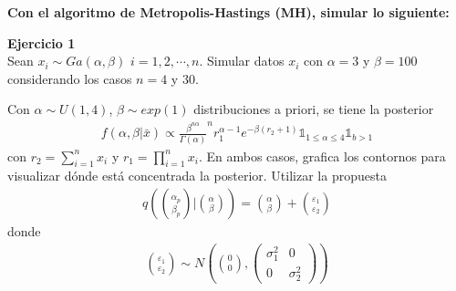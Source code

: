 \documentclass[a4paper, 11pt]{article}
\newenvironment{problem}[2][Ejercicio]
{ \begin{mdframed}[backgroundcolor= red!50] \textbf{#1 #2} \\}
	{  \end{mdframed}}
\begin{document}
	\setlength{\parskip}{\medskipamount}
	\setlength{\parindent}{0pt}
\textbf{Con el algoritmo de Metropolis-Hastings (MH), simular lo siguiente:}
\begin{problem}{1} 
  Sean $x_i \sim Ga(\alpha,\beta)$ $i =1,2,\cdots,n$. Simular datos $x_i$ con $\alpha = 3$ y $\beta = 100$ considerando los casos $n=4$ y 30.
  
  Con $\alpha \sim U(1,4)$, $\beta \sim exp(1)$ distribuciones a priori, se tiene la posterior 
  \begin{align*}
    f(\alpha, \beta|\bar{x} ) \propto \frac{\beta^{n\alpha}}{\Gamma(\alpha)}^{n }  r_1^{\alpha-1}e^{-\beta(r_2 + 1)} \mathbb{1}_{1 \leq \alpha \leq 4} \mathbb{1}_{b>1}
  \end{align*}
  con $r_2 = \sum_{i=1}^{n } x_i$ y $r_1 = \prod_{i =1}^{n }x_i$.
  En ambos casos, grafica los contornos para visualizar dónde está concentrada la posterior.
  Utilizar la propuesta
  \begin{align*}
    q \left(\binom{\alpha_p }{\beta_p }| \binom{\alpha}{\beta}\right) = \binom{\alpha}{\beta} + \binom{\varepsilon_1}{\varepsilon_2}
  \end{align*}
  donde
  \begin{align*}
    \binom{\varepsilon_1}{\varepsilon_2} \sim N \left(\binom{0}{0}, \begin{pmatrix}
      \sigma_1^2 &0 \\ 
      0 & \sigma_2^2 
      \end{pmatrix} \right)
  \end{align*}

\end{problem}
\end{document}
